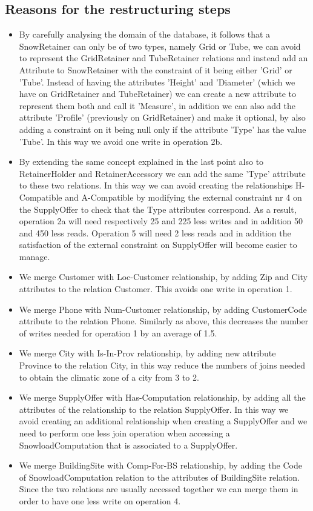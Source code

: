 \documentclass{article}[h]
\begin{document}
{{\subsection{Reasons for the restructuring steps}
\begin{itemize}
  \item By carefully analysing the domain of the database, it follows that a SnowRetainer can only be of two types, namely Grid or Tube, we can avoid to represent the GridRetainer and TubeRetainer relations and instead add an Attribute to SnowRetainer with the constraint of it being either 'Grid' or 'Tube'. Instead of having the attributes 'Height' and 'Diameter' (which we have on GridRetainer and TubeRetainer) we can create a new attribute to represent them both and call it 'Measure', in addition we can also add the attribute 'Profile' (previously on GridRetainer) and make it optional, by also adding a constraint on it being null only if the attribute 'Type' has the value 'Tube'. In this way we avoid one write in operation 2b.
  \item By extending the same concept explained in the last point also to RetainerHolder and RetainerAccessory we can add the same 'Type' attribute to these two relations. In this way we can avoid creating the relationships H-Compatible and A-Compatible by modifying the external constraint nr 4 on the SupplyOffer to check that the Type attributes correspond. As a result, operation 2a will need respectively 25 and 225 less writes and in addition 50 and 450 less reads. Operation 5 will need 2 less reads and in addition the satisfaction of the external constraint on SupplyOffer will become easier to manage.
  \item We merge Customer with Loc-Customer relationship, by adding Zip and City attributes to the relation Customer. This avoids one write in operation 1.
  \item We merge Phone with Num-Customer relationship, by adding CustomerCode attribute to the relation Phone. Similarly as above, this decreases the number of writes needed for operation 1 by an average of 1.5.
  \item We merge City with Is-In-Prov relationship, by adding new attribute Province to the relation City, in this way reduce the numbers of joins needed to obtain the climatic zone of a city from 3 to 2.
  \item We merge SupplyOffer with Has-Computation relationship, by adding all the attributes of the relationship to the relation SupplyOffer. In this way we avoid creating an additional relationship when creating a SupplyOffer and we need to perform one less join operation when accessing a SnowloadComputation that is associated to a SupplyOffer.
  \item We merge BuildingSite with Comp-For-BS relationship, by adding the Code of SnowloadComputation relation to the  attributes of BuildingSite relation. Since the two relations are usually accessed together we can merge them in order to have one less write on operation 4.
\end{itemize}

}}
\end{document}
